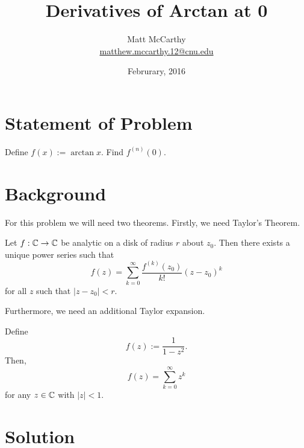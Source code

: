 \documentclass[notitlepage]{simple}
\author{Matt McCarthy\\\href{mailto:matthew.mccarthy.12@cnu.edu}{matthew.mccarthy.12@cnu.edu}}
\title{Derivatives of Arctan at 0}
\date{Februrary, 2016}
\begin{document}
\maketitle

\section{Statement of Problem}

Define $f(x):=\arctan x$.
Find $f^{(n)}(0)$.

\section{Background}

For this problem we will need two theorems.
Firstly, we need Taylor's Theorem.
\begin{thm}
	Let $f:\mathbb{C}\rightarrow\mathbb{C}$ be analytic on a disk of radius $r$ about $z_0$.
	Then there exists a unique power series such that
	\[
		f(z)=\sum_{k=0}^\infty \frac{f^{(k)}(z_0)}{k!}(z-z_0)^k
	\]
	for all $z$ such that $|z-z_0|<r$.
\end{thm}
Furthermore, we need an additional Taylor expansion.
\begin{thm}
	Define
	\[
		f(z):=\frac{1}{1-z^2}.
	\]
	Then,
	\[
		f(z)=\sum_{k=0}^\infty z^k
	\]
	for any $z\in\mathbb{C}$ with $|z|<1$.
\end{thm}

\section{Solution}
\end{document}
